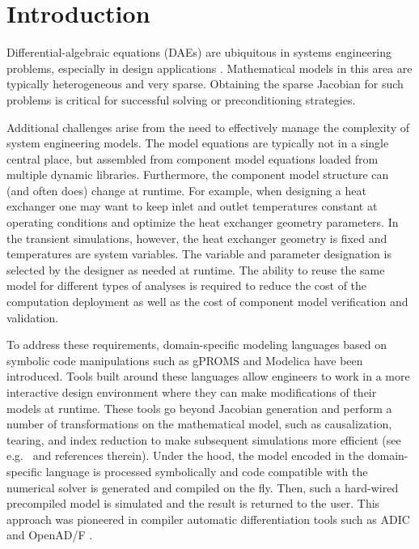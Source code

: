 \documentclass[10pt]{ijnam}
\theoremstyle{definition}
\begin{document}
\section{Introduction}  \label{sec:introduction}

Differential-algebraic equations (DAEs) are ubiquitous in systems engineering 
problems, especially in design applications 
\cite{crawley2008contrasting,wetter2009modelica,wu2010fast,karimi2004modeling,lee2002power}. 
Mathematical models in this area 
are typically heterogeneous and very sparse. Obtaining the sparse Jacobian for such 
problems is critical for successful solving or preconditioning strategies.

Additional challenges arise from the need to effectively manage the complexity of system 
engineering models. The model equations are typically not in a single central place, but
assembled from component model equations loaded from multiple dynamic libraries.
Furthermore, the component model structure can (and often does) change at runtime. 
For example, when designing a heat exchanger one may want to keep inlet and outlet temperatures 
constant at operating conditions and optimize the heat exchanger geometry
parameters. In the transient simulations, however, the heat exchanger geometry is fixed and 
temperatures are system variables. The variable and parameter designation is selected by
the designer as needed at runtime. The ability to reuse the same model for 
different types of analyses is required to reduce the cost of the computation deployment as
well as the cost of component model verification and validation.

To address these requirements, domain-specific modeling languages based on symbolic code 
manipulations such as gPROMS \cite{oh1996} and Modelica \cite{olsson2012} have been 
introduced. Tools built around these languages \cite{dymola,wolfram,maple,gproms,matlab} 
allow engineers to work in a more interactive design environment 
where they can make modifications of their models at runtime. These tools go beyond Jacobian 
generation and perform a number of transformations on the mathematical model, such as causalization,
tearing, and index reduction to make subsequent simulations more efficient (see e.g.~\cite{cellier2006} and references therein). Under the hood, the model 
encoded in the domain-specific language is processed symbolically and code compatible 
with the numerical solver is generated and compiled on the fly. Then, such a hard-wired precompiled 
model is simulated and the result is returned to the user. This approach was pioneered in 
compiler automatic differentiation tools such as ADIC \cite{bischof1997adic} and 
OpenAD/F \cite{utke2008}.
\end{document}
